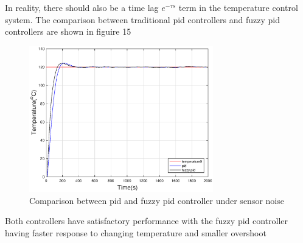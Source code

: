 In reality, there should also be a time lag $e^{-\tau s}$ term in the temperature control system. 
The comparison between traditional pid controllers and fuzzy pid controllers are shown in figuire 15
\begin{figure}[H]
\centering
\includegraphics[width = 8cm]{pidpid.eps}
\caption{Comparison between pid and fuzzy pid controller under sensor noise}
\end{figure}
Both controllers have satisfactory performance with the fuzzy pid controller having faster response to changing temperature and smaller overshoot 

